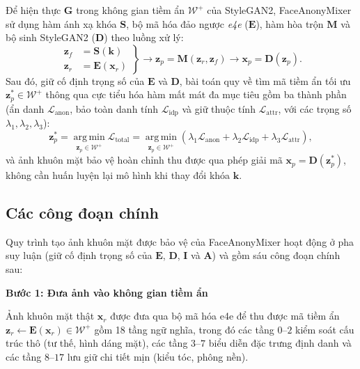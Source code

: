 Để hiện thực $\mathbf{G}$ trong không gian tiềm ẩn $\mathcal{W}^+$ của StyleGAN2, FaceAnonyMixer sử dụng hàm ánh xạ khóa $\mathbf{S}$, bộ mã hóa đảo ngược \textit{e4e} ($\mathbf{E}$), hàm hòa trộn $\mathbf{M}$ và bộ sinh StyleGAN2 ($\mathbf{D}$) theo luồng xử lý:
\begin{equation}
\left.
\begin{aligned}
\mathbf{z}_f &= \mathbf{S}(\mathbf{k}) \\
\mathbf{z}_r &= \mathbf{E}(\mathbf{x}_r)
\end{aligned}
\right\}
\longrightarrow
\mathbf{z}_p = \mathbf{M}(\mathbf{z}_r, \mathbf{z}_f)
\longrightarrow
\mathbf{x}_p = \mathbf{D}(\mathbf{z}_p).
\end{equation}
Sau đó, giữ cố định trọng số của $\mathbf{E}$ và $\mathbf{D}$, bài toán quy về tìm mã tiềm ẩn tối ưu $\mathbf{z}_p^* \in \mathcal{W}^+$ thông qua cực tiểu hóa hàm mất mát đa mục tiêu gồm ba thành phần (ẩn danh $\mathcal{L}_{\text{anon}}$, bảo toàn danh tính $\mathcal{L}_{\text{idp}}$ và giữ thuộc tính $\mathcal{L}_{\text{attr}}$, với các trọng số $\lambda_1, \lambda_2, \lambda_3$):
\begin{equation}
\mathbf{z}_p^* = \operatorname*{arg\,min}_{\mathbf{z}_p \in \mathcal{W}^+} \mathcal{L}_{\text{total}} = \operatorname*{arg\,min}_{\mathbf{z}_p \in \mathcal{W}^+} \left( \lambda_1 \mathcal{L}_{\text{anon}} + \lambda_2 \mathcal{L}_{\text{idp}} + \lambda_3 \mathcal{L}_{\text{attr}} \right),
\end{equation}
và ảnh khuôn mặt bảo vệ hoàn chỉnh thu được qua phép giải mã $\mathbf{x}_p = \mathbf{D}(\mathbf{z}_p^*)$, không cần huấn luyện lại mô hình khi thay đổi khóa $\mathbf{k}$.
\par
\endgroup

\subsection{Các công đoạn chính}
\label{sec::cac-cong-doan-chinh}

\begingroup
\setlength{\abovedisplayskip}{6pt plus 2pt minus 2pt}
\setlength{\belowdisplayskip}{6pt plus 2pt minus 2pt}
\setlength{\jot}{3pt}
Quy trình tạo ảnh khuôn mặt được bảo vệ của FaceAnonyMixer hoạt động ở pha suy luận (giữ cố định trọng số của $\mathbf{E}$, $\mathbf{D}$, $\mathbf{I}$ và $\mathbf{A}$) và gồm sáu công đoạn chính sau:

\par\medskip\noindent\textbf{Bước 1: Đưa ảnh vào không gian tiềm ẩn}\par\smallskip
Ảnh khuôn mặt thật $\mathbf{x}_r$ được đưa qua bộ mã hóa e4e để thu được mã tiềm ẩn $\mathbf{z}_r \leftarrow \mathbf{E}(\mathbf{x}_r) \in \mathcal{W}^+$ gồm 18 tầng ngữ nghĩa, trong đó các tầng $0\text{--}2$ kiểm soát cấu trúc thô (tư thế, hình dáng mặt), các tầng $3\text{--}7$ biểu diễn đặc trưng định danh và các tầng $8\text{--}17$ lưu giữ chi tiết mịn (kiểu tóc, phông nền).


